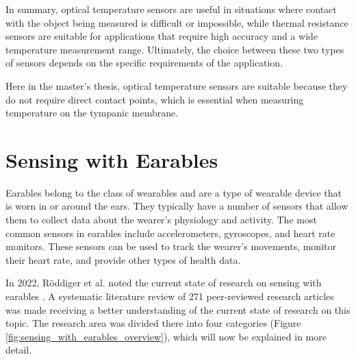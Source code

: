 In summary, optical temperature sensors are useful in situations where contact with the object being measured is difficult or impossible, while thermal resistance sensors are suitable for applications that require high accuracy and a wide temperature measurement range. 
Ultimately, the choice between these two types of sensors depends on the specific requirements of the application.

Here in the master's thesis, optical temperature sensors are suitable because they do not require direct contact points, which is essential when measuring temperature on the tympanic membrane.

\section{Sensing with Earables}
\label{Background:SensingWithEarables}
Earables belong to the class of wearables and are a type of wearable device that is worn in or around the ears. 
They typically have a number of sensors that allow them to collect data about the wearer's physiology and activity. 
The most common sensors in earables include accelerometers, gyroscopes, and heart rate monitors. 
These sensors can be used to track the wearer's movements, monitor their heart rate, and provide other types of health data.

In 2022, Röddiger et al. noted the current state of research on sensing with earables \cite{roddigerSensingEarablesSystematic2022a}.
A systematic literature review of 271 peer-reviewed research articles was made receiving a better understanding of the current state of research on this topic.
The research area was divided there into four categories (Figure \ref{fig:sensing_with_earables_overview}), which will now be explained in more detail.

